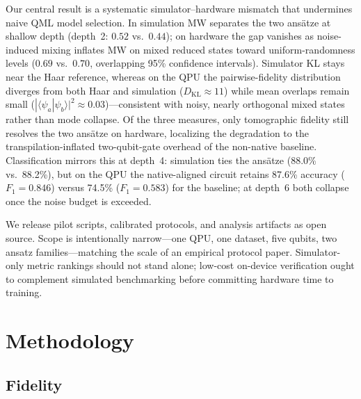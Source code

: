 \documentclass[letterpaper]{article} %
\begin{document}
Our central result is a systematic simulator--hardware mismatch that undermines naive QML model selection.
In simulation MW separates the two ans\"atze at shallow depth (depth~2: $0.52$ vs.\ $0.44$); on hardware the gap vanishes as noise-induced mixing inflates MW on mixed reduced states toward uniform-randomness levels ($0.69$ vs.\ $0.70$, overlapping 95\% confidence intervals).
Simulator KL stays near the Haar reference, whereas on the QPU the pairwise-fidelity distribution diverges from both Haar and simulation ($D_{\mathrm{KL}} \approx 11$) while mean overlaps remain small ($|\langle\psi_a|\psi_b\rangle|^2 \approx 0.03$)---consistent with noisy, nearly orthogonal mixed states rather than mode collapse.
Of the three measures, only tomographic fidelity still resolves the two ans\"atze on hardware, localizing the degradation to the transpilation-inflated two-qubit-gate overhead of the non-native baseline.
Classification mirrors this at depth~4: simulation ties the ans\"atze (88.0\% vs.\ 88.2\%), but on the QPU the native-aligned circuit retains 87.6\% accuracy ($F_1 = 0.846$) versus 74.5\% ($F_1 = 0.583$) for the baseline; at depth~6 both collapse once the noise budget is exceeded.

We release pilot scripts, calibrated protocols, and analysis artifacts as open source.
Scope is intentionally narrow---one QPU, one dataset, five qubits, two ansatz families---matching the scale of an empirical protocol paper.
Simulator-only metric rankings should not stand alone; low-cost on-device verification ought to complement simulated benchmarking before committing hardware time to training.


\section{Methodology}

\subsection{Fidelity}
\end{document}
